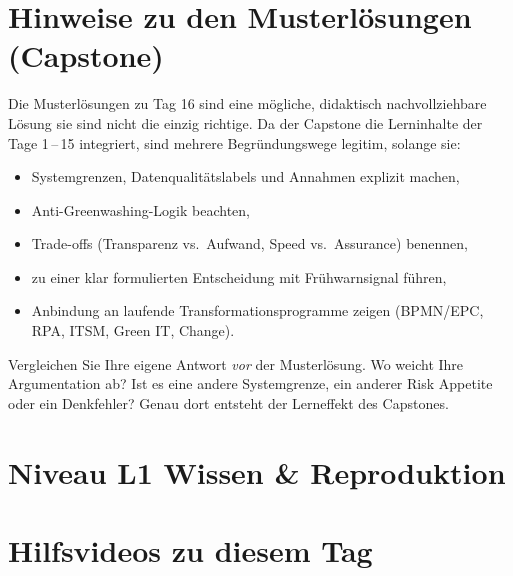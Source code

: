 \documentclass[11pt,a4paper,oneside]{article}
\begin{document}
\section*{Hinweise zu den Musterl\"osungen (Capstone)}
\thispagestyle{plain}

\noindent Die Musterl\"osungen zu Tag 16 sind eine m\"ogliche, didaktisch nachvollziehbare L\"osung \textendash{} sie sind nicht die einzig richtige. Da der Capstone die Lerninhalte der Tage 1\,--\,15 integriert, sind mehrere Begr\"undungswege legitim, solange sie:

\begin{itemize}
  \item Systemgrenzen, Datenqualit\"atslabels und Annahmen explizit machen,
  \item Anti-Greenwashing-Logik beachten,
  \item Trade-offs (Transparenz vs.\ Aufwand, Speed vs.\ Assurance) benennen,
  \item zu einer klar formulierten Entscheidung mit Fr\"uhwarnsignal f\"uhren,
  \item Anbindung an laufende Transformationsprogramme zeigen (BPMN/EPC, RPA, ITSM, Green IT, Change).
\end{itemize}

\begin{infobox}
Vergleichen Sie Ihre eigene Antwort \emph{vor} der Musterl\"osung. Wo weicht Ihre Argumentation ab? Ist es eine andere Systemgrenze, ein anderer Risk Appetite \textendash{} oder ein Denkfehler? Genau dort entsteht der Lerneffekt des Capstones.
\end{infobox}

\clearpage

\section*{Niveau L1 \textendash{} Wissen \& Reproduktion}

\section*{Hilfsvideos zu diesem Tag}
\thispagestyle{plain}
\end{document}
